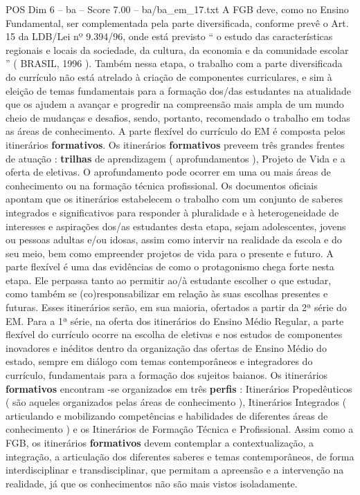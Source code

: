 \begin{textsample}{POS Dim 6 – ba – Score 7.00 – ba/ba\_em\_17.txt}
A FGB deve, como no Ensino Fundamental, ser complementada pela parte diversificada, conforme prevê o Art. 15 da LDB/Lei nº 9.394/96, onde está previsto “ o estudo das características regionais e locais da sociedade, da cultura, da economia e da comunidade escolar ” ( BRASIL, 1996 ).
Também nessa etapa, o trabalho com a parte diversificada do currículo não está atrelado à criação de componentes curriculares, e sim à eleição de temas fundamentais para a formação dos/das estudantes na atualidade que os ajudem a avançar e progredir na compreensão mais ampla de um mundo cheio de mudanças e desafios, sendo, portanto, recomendado o trabalho em todas as áreas de conhecimento.
A parte flexível do currículo do EM é composta pelos itinerários \textbf{formativos}.
Os itinerários \textbf{formativos} preveem três grandes frentes de atuação : \textbf{trilhas} de aprendizagem ( aprofundamentos ), Projeto de Vida e a oferta de eletivas.
O aprofundamento pode ocorrer em uma ou mais áreas de conhecimento ou na formação técnica profissional.
Os documentos oficiais apontam que os itinerários estabelecem o trabalho com um conjunto de saberes integrados e significativos para responder à pluralidade e à heterogeneidade de interesses e aspirações dos/as estudantes desta etapa, sejam adolescentes, jovens ou pessoas adultas e/ou idosas, assim como intervir na realidade da escola e do seu meio, bem como empreender projetos de vida para o presente e futuro.
A parte flexível é uma das evidências de como o protagonismo chega forte nesta etapa.
Ele perpassa tanto ao permitir ao/à estudante escolher o que estudar, como também se (co)responsabilizar em relação às suas escolhas presentes e futuras.
Esses itinerários serão, em sua maioria, ofertados a partir da 2ª série do EM.
Para a 1ª série, na oferta dos itinerários do Ensino Médio Regular, a parte flexível do currículo ocorre na escolha de eletivas e nos estudos de componentes inovadores e inéditos dentro da organização das ofertas de Ensino Médio do estado, sempre em diálogo com temas contemporâneos e integradores do currículo, fundamentais para a formação dos sujeitos baianos.
Os itinerários \textbf{formativos} encontram -se organizados em três \textbf{perfis} : Itinerários Propedêuticos ( são aqueles organizados pelas áreas de conhecimento ), Itinerários Integrados ( articulando e mobilizando competências e habilidades de diferentes áreas de conhecimento ) e os Itinerários de Formação Técnica e Profissional.
Assim como a FGB, os itinerários \textbf{formativos} devem contemplar a contextualização, a integração, a articulação dos diferentes saberes e temas contemporâneos, de forma interdisciplinar e transdisciplinar, que permitam a apreensão e a intervenção na realidade, já que os conhecimentos não são mais vistos isoladamente.

\end{textsample}
